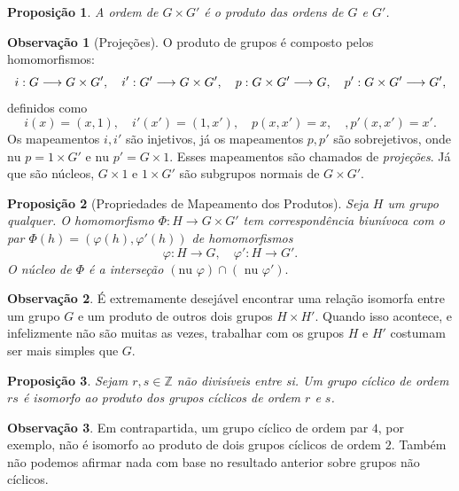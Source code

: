 \documentclass[a4paper,12pt]{report}
\theoremstyle{plain}
\newtheorem{proposicao}{Proposição}[section]
\theoremstyle{definition}
\newtheorem{observacao}{Observação}[section]
\begin{document}
\begin{proposicao}
	A ordem de \(G\times G'\) é o produto das ordens de
	\(G\) e \(G'\).	
\end{proposicao}

\begin{observacao}[Projeções]
	O produto de grupos é composto pelos homomorfismos:
	\[i: G\longrightarrow G\times G', \quad i': G'\longrightarrow G\times G', \newline \quad p: G\times G'\longrightarrow G, \quad p': G\times G'\longrightarrow G',\]
	definidos como
	\[i(x) = (x,1), \quad i'(x') = (1,x'), \quad p(x,x') = x, \quad, p'(x,x') = x'.\]
	Os mapeamentos \(i,i'\) são injetivos, já os mapeamentos \(p,p'\) são
	sobrejetivos, onde \(\text{nu }p = 1\times G'\) e
	\(\text{nu }p' = G\times 1\). Esses mapeamentos são chamados de
	\emph{projeções}. Já que são núcleos, \(G\times 1\) e \(1\times G'\)
	são subgrupos normais de \(G\times G'\).
\end{observacao}

\begin{proposicao}[Propriedades de Mapeamento dos Produtos]
	Seja
	\(H\) um grupo qualquer. O homomorfismo
	\(\Phi: H\longrightarrow G\times G'\) tem correspondência biunívoca com
	o par $ \Phi(h) = (\varphi(h), \varphi'(h))$ de homomorfismos
	\[\varphi:H\longrightarrow G, \quad \varphi': H\longrightarrow G'.\]
	O núcleo de \(\Phi\) é a interseção
	\((\text{nu }\varphi)\cap(\text{ nu }\varphi').\)	
\end{proposicao}

\begin{observacao}
	É extremamente desejável encontrar uma relação isomorfa entre um grupo
	\(G\) e um produto de outros dois grupos \(H\times H'\). Quando isso
	acontece, e infelizmente não são muitas as vezes, trabalhar com os
	grupos \(H\) e \(H'\) costumam ser mais simples que \(G\).
\end{observacao}

\begin{proposicao}
	Sejam \(r,s\in\mathbb{Z}\) não divisíveis entre si.
	Um grupo cíclico de ordem \(rs\) é isomorfo ao produto dos grupos
	cíclicos de ordem \(r\) e \(s\).	
\end{proposicao}

\begin{observacao}
	Em contrapartida, um grupo cíclico de ordem par \(4\), por exemplo, não
	é isomorfo ao produto de dois grupos cíclicos de ordem \(2\). Também não
	podemos afirmar nada com base no resultado anterior sobre grupos não
	cíclicos.
\end{observacao}
\end{document}
